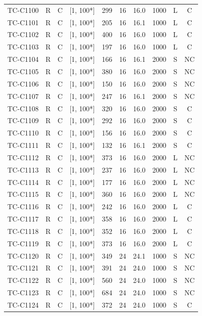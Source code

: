 \begin{longtable}{lccccccccc}
TC-C1100 & R & C & [1, 100*] & 299 & 16 & 16.0 & 1000 & L & C \\
TC-C1101 & R & C & [1, 100*] & 205 & 16 & 16.1 & 1000 & L & C \\
TC-C1102 & R & C & [1, 100*] & 400 & 16 & 16.0 & 1000 & L & C \\
TC-C1103 & R & C & [1, 100*] & 197 & 16 & 16.0 & 1000 & L & C \\
TC-C1104 & R & C & [1, 100*] & 166 & 16 & 16.1 & 2000 & S & NC \\
TC-C1105 & R & C & [1, 100*] & 380 & 16 & 16.0 & 2000 & S & NC \\
TC-C1106 & R & C & [1, 100*] & 150 & 16 & 16.0 & 2000 & S & NC \\
TC-C1107 & R & C & [1, 100*] & 247 & 16 & 16.1 & 2000 & S & NC \\
TC-C1108 & R & C & [1, 100*] & 320 & 16 & 16.0 & 2000 & S & C \\
TC-C1109 & R & C & [1, 100*] & 292 & 16 & 16.0 & 2000 & S & C \\
TC-C1110 & R & C & [1, 100*] & 156 & 16 & 16.0 & 2000 & S & C \\
TC-C1111 & R & C & [1, 100*] & 132 & 16 & 16.1 & 2000 & S & C \\
TC-C1112 & R & C & [1, 100*] & 373 & 16 & 16.0 & 2000 & L & NC \\
TC-C1113 & R & C & [1, 100*] & 237 & 16 & 16.0 & 2000 & L & NC \\
TC-C1114 & R & C & [1, 100*] & 177 & 16 & 16.0 & 2000 & L & NC \\
TC-C1115 & R & C & [1, 100*] & 360 & 16 & 16.0 & 2000 & L & NC \\
TC-C1116 & R & C & [1, 100*] & 242 & 16 & 16.0 & 2000 & L & C \\
TC-C1117 & R & C & [1, 100*] & 358 & 16 & 16.0 & 2000 & L & C \\
TC-C1118 & R & C & [1, 100*] & 352 & 16 & 16.0 & 2000 & L & C \\
TC-C1119 & R & C & [1, 100*] & 373 & 16 & 16.0 & 2000 & L & C \\
TC-C1120 & R & C & [1, 100*] & 349 & 24 & 24.1 & 1000 & S & NC \\
TC-C1121 & R & C & [1, 100*] & 391 & 24 & 24.0 & 1000 & S & NC \\
TC-C1122 & R & C & [1, 100*] & 560 & 24 & 24.0 & 1000 & S & NC \\
TC-C1123 & R & C & [1, 100*] & 684 & 24 & 24.0 & 1000 & S & NC \\
TC-C1124 & R & C & [1, 100*] & 372 & 24 & 24.0 & 1000 & S & C \\

\end{longtable}
